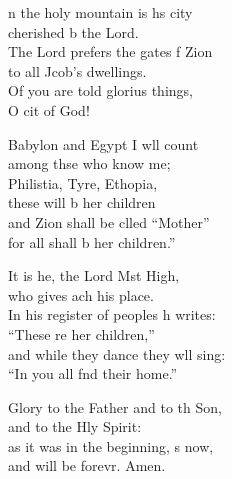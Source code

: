 \settowidth{\versewidth}{In his register of peoples he writes: *}
\begin{psalmverse}%
  \begin{patverse}
n the holy mountain is h\pointup{\i}s city\Med\\
cherished b the Lord.\\
The Lord prefers the gates f Zion\Med\\
to all Jcob’s dwellings.\\
Of you are told glorius things,\Med\\
O cit of God!

Babylon and Egypt I w\pointup{\i}ll count\Med\\
among thse who know me;\\
Philistia, Tyre, Eth\pointup{\i}opia,\Med\\
these will b her children\\
and Zion shall be clled “Mother”\Med\\
for all shall b her children.”

It is he, the Lord Mst High,\Med\\
who gives ach his place.\\
In his register of peoples h writes:\Med\\
“These re her children,”\\
and while they dance they w\pointup{\i}ll sing:\Med\\
“In you all f\pointup{\i}nd their home.”

Glory to the Father and to th Son,\Med\\
and to the Hly Spirit:\\
as it was in the beginning, \pointup{\i}s now,\Med\\
and will be forevr. Amen.
  \end{patverse}
\end{psalmverse}

